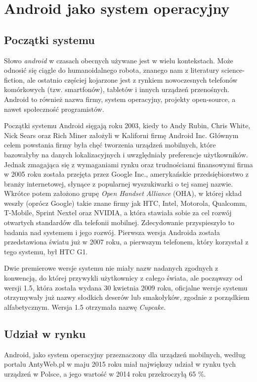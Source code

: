 \chapter{Android jako system operacyjny}

\section{Początki systemu}
Słowo \textit{android} w czasach obecnych używane jest w wielu kontekstach. Może odnosić się ciągle do humanoidalnego robota, znanego nam z literatury science-fiction, ale ostatnio częściej kojarzone jest z rynkiem nowoczesnych telefonów komórkowych (tzw. smartfonów), tabletów i innych urządzeń przenośnych. Android to również nazwa firmy, system operacyjny, projekty open-source, a nawet społeczność programistów.

Początki systemu Android sięgają roku 2003, kiedy to Andy Rubin, Chris White, Nick Sears oraz Rich Miner założyli w Kaliforni firmę Android Inc. Głównym celem powstania firmy była chęć tworzenia urządzeń mobilnych, które bazowałyby na danych lokalizacyjnych i uwzględniały preferencje użytkowników. Jednak zmagająca się z wymaganiami rynku oraz trudnościami finansowymi firma w 2005 roku została przejęta przez Google Inc., amerykańskie przedsiębiorstwo z branży internetowej, słynące z popularnej wyszukiwarki o tej samej nazwie. Wkrótce potem założono grupę \textit{Open Handset Alliance} (OHA), w której skład weszły (oprócz Google) takie znane firmy jak HTC, Intel, Motorola, Qualcomm, T-Mobile, Sprint Nextel oraz NVIDIA, a która stawiała sobie za cel rozwój otwartych standardów dla telefonii mobilnej. Zdecydowanie przyspieszyło to badania nad systemem i jego rozwój. Pierwsza wersja Androida została przedstawiona światu już w 2007 roku, a pierwszym telefonem, który korzystał z tego systemu, był HTC G1.

Dwie premierowe wersje systemu nie miały nazw nadanych zgodnych z konwencją, do której przywykli użytkownicy z całego świata, ale począwszy od wersji 1.5, która została wydana 30 kwietnia 2009 roku, oficjalne wersje systemu otrzymywały już nazwy słodkich deserów lub smakołyków, zgodnie z porządkiem alfabetycznym. Wersja 1.5 otrzymała nazwę \textit{Cupcake}.

\section{Udział w rynku}
Android, jako system operacyjny przeznaczony dla urządzeń mobilnych, według portalu AntyWeb.pl w maju 2015 roku miał największy udział w rynku tych urządzeń w Polsce, a jego wartość w 2014 roku przekroczyłą 65 \%. 

